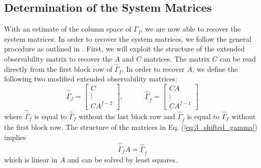 \subsection{Determination of the System Matrices}\label{sec:3_system_matrices}
With an estimate of the column space of $\Gamma_f$, we are now able to recover the system matrices. In order to recover the system matrices, we follow the general procedure as outlined in \cite{katayama2005subspace}. First, we will exploit the structure of the extended observability matrix to recover the $A$ and $C$ matrices. The matrix $C$ can be read directly from the first block row of $\hat{\Gamma}_f$. In order to recover $A$, we define the following two modified extended observability matrices:
\begin{equation}\label{eq:3_shifted_gamma}
\hat{\overline{\Gamma}}_f = \begin{bmatrix}C\\ \vdots \\ CA^{f-2}\end{bmatrix}, \hspace{3em}
\hat{\underline{\Gamma}}_f = \begin{bmatrix}CA\\ \vdots \\ CA^{f-1}\end{bmatrix}
\end{equation}
where $\hat{\overline{\Gamma}}_f$ is equal to $\hat{\Gamma}_f$ without the last block row and $\hat{\underline{\Gamma}}_f$ is equal to $\hat{\Gamma}_f$ without the first block row. The structure of the matrices in Eq. (\ref{eq:3_shifted_gamma}) implies
\begin{equation}
\hat{\overline{\Gamma}}_f A = \hat{\underline{\Gamma}}_f
\end{equation}
which is linear in $A$ and can be solved by least squares.

